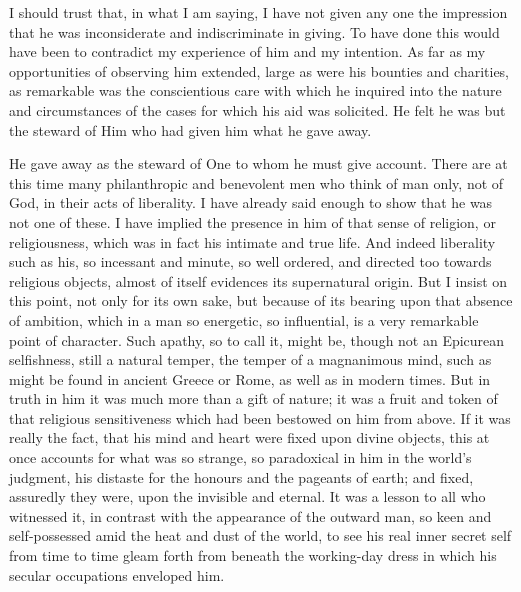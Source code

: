 I should trust that, in what I am saying, I have not
given any one the impression that he was inconsiderate
and indiscriminate in giving. To have done this would
have been to contradict my experience of him and my
intention. As far as my opportunities of observing him
extended, large as were his bounties and charities, as
remarkable was the conscientious care with which he
inquired into the nature and circumstances of the cases
for which his aid was solicited. He felt he was but the
steward of Him who had given him what he gave away.

He gave away as the steward of One to whom he must
give account. There are at this time many philanthropic
and benevolent men who think of man only, not of God, in
their acts of liberality. I have already said enough to
show that he was not one of these. I have implied the
presence in him of that sense of religion, or
religiousness, which was in fact his intimate and true
life. And indeed liberality such as his, so incessant and
minute, so well ordered, and directed too towards
religious objects, almost of itself evidences its
supernatural origin. But I insist on this point, not only
for its own sake, but because of its bearing upon that
absence of ambition, which in a man so energetic, so
influential, is a very remarkable point of character.
Such apathy, so to call it, might be, though not an
Epicurean selfishness, still a natural temper, the temper
of a magnanimous mind, such as might be found in ancient
Greece or Rome, as well as in modern times. But in truth
in him it was much more than a gift of nature; it was a
fruit and token of that religious sensitiveness which had
been bestowed on him from above. If it was really the
fact, that his mind and heart were fixed upon divine
objects, this at once accounts for what was so strange,
so paradoxical in him in the world's judgment, his
distaste for the honours and the pageants of earth; and
fixed, assuredly they were, upon the invisible and
eternal. It was a lesson to all who witnessed it, in
contrast with the appearance of the outward man, so keen
and self-possessed amid the heat and dust of the world,
to see his real inner secret self from time to time gleam
forth from beneath the working-day dress in which his
secular occupations enveloped him.


